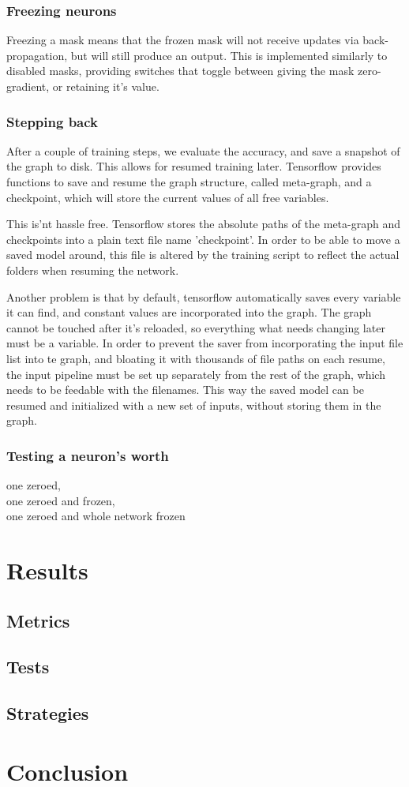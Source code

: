 \documentclass[a4paper,12pt]{article}
\begin{document}
\subsubsection{Freezing neurons}
Freezing a mask means that the frozen mask will not receive updates via back-propagation, but will still produce an output. This is implemented similarly to disabled masks, providing switches that toggle between giving the mask zero-gradient, or retaining it's value.
\subsubsection{Stepping back}
After a couple of training steps, we evaluate the accuracy, and save a snapshot of the graph to disk. This allows for resumed training later. Tensorflow provides functions to save and resume the graph structure, called meta-graph, and a checkpoint, which will store the current values of all free variables.\par
This is'nt hassle free. Tensorflow stores the absolute paths of the meta-graph and checkpoints into a plain text file name 'checkpoint'. In order to be able to move a saved model around, this file is altered by the training script to reflect the actual folders when resuming the network.\par
Another problem is that by default, tensorflow automatically saves every variable it can find, and constant values are incorporated into the graph. The graph cannot be touched after it's reloaded, so everything what needs changing later must be a variable. In order to prevent the saver from incorporating the input file list into te graph, and bloating it with thousands of file paths on each resume, the input pipeline must be set up separately from the rest of the graph, which needs to be feedable with the filenames. This way the saved model can be resumed and initialized with a new set of inputs, without storing them in the graph.
\subsubsection{Testing a neuron's worth}
one zeroed,\\
one zeroed and frozen,\\
one zeroed and whole network frozen
\newpage
\section{Results}
\subsection{Metrics}
\subsection{Tests}
\subsection{Strategies}
\newpage
\section{Conclusion}
\begin{appendix}
\listoffigures
\listoftables
\end{appendix}
\end{document}
